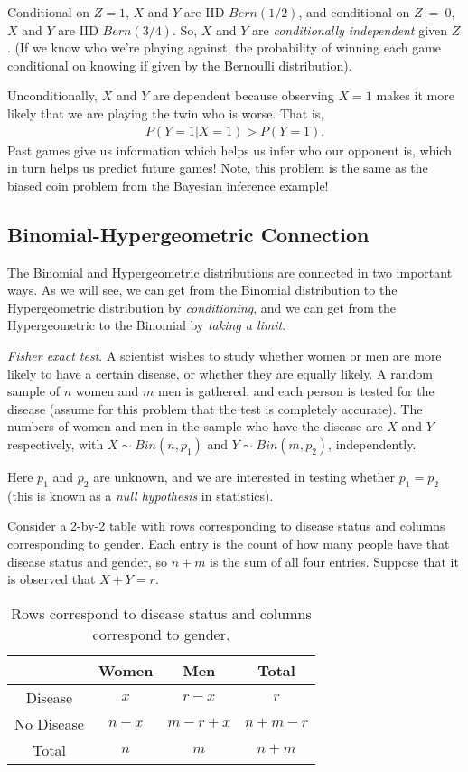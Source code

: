 \documentclass[11pt,a4paper]{article}
\begin{document}
Conditional on \(Z = 1\), 
\(X\) and \(Y\) are IID \(Bern(1/2)\), 
and conditional on \(Z\  = \ 0\), 
\(X\) and \(Y\) are IID \(Bern(3/4)\).
So, \(X\) and \(Y\) are \emph{conditionally independent} given \(Z\).
(If we know who we're playing against, 
the probability of winning each game conditional on 
knowing if given by the Bernoulli distribution).

Unconditionally, 
\(X\) and \(Y\) are dependent because observing \(X = 1\) 
makes it more likely that we are playing the twin who is worse. 
That is,
\begin{align}
P(Y = 1|X = 1) > P(Y = 1).
\end{align}
Past games give us information which helps us infer who our opponent is,
which in turn helps us predict future games! 
Note, this problem is the same as the biased coin problem from the Bayesian inference example!

\subsection{Binomial-Hypergeometric Connection}

The Binomial and Hypergeometric distributions are connected in two important ways. 
As we will see, 
we can get from the Binomial distribution to the Hypergeometric distribution by \emph{conditioning},
and we can get from the Hypergeometric to the Binomial by \emph{taking a limit}.

\emph{Fisher exact test}. 
A scientist wishes to study whether women or 
men are more likely to have a certain disease, 
or whether they are equally likely. 
A random sample of \(n\) women and \(m\) men is gathered, 
and each person is tested for the disease (assume for this problem that the test is completely accurate). 
The numbers of women and men in the sample who have the disease are \(X\) and \(Y\) respectively,
with \(X \sim Bin(n,p_{1})\) and \(Y \sim Bin(m,p_{2})\),
independently.

Here \(p_{1}\) and \(p_{2}\) are unknown, 
and we are interested in testing whether \(p_{1} = p_{2}\) (this is known as a \emph{null hypothesis} in statistics).

Consider a 2-by-2 table with rows corresponding to disease status and
columns corresponding to gender. 
Each entry is the count of how many
people have that disease status and gender, so \(n + m\) is the sum of all four entries. 
Suppose that it is observed that \(X + Y = r\).

\begin{table}[h!]
\centering
\begin{tabular}{| c | c | c | c |}
\hline
& Women & Men & Total \\\hline
Disease & $x$ & $r-x$ & $r$ \\\hline
No Disease & $n-x$ & $m-r+x$ & $n+m-r$ \\\hline
Total & $n$ & $m$ & $n+m$ \\\hline
\end{tabular}
\caption{%
Rows correspond to disease status and columns correspond to gender.
}
\end{table}
\end{document}
